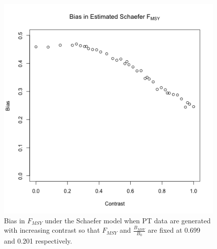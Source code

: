 \documentclass[12pt]{article}
\begin{document}
%
\begin{figure}
\begin{minipage}[h!]{0.49\textwidth}
\includegraphics[width=\textwidth]{../ptNew/contrastTest.png}
\end{minipage}
\begin{minipage}[h!]{0.49\textwidth}
\caption{
Bias in $F_{MSY}$ under the Schaefer model when PT data are generated 
with increasing contrast so that $F_{MSY}$ and $\frac{B_{MSY}}{B_0}$ are fixed at 
0.699 and 0.201 respectively. %
}
\end{minipage}
\label{conTest}
\end{figure}
\end{document}
